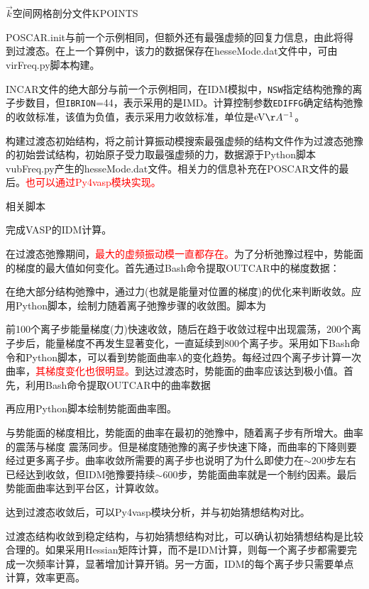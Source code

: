 $\vec k$空间网格剖分文件\textrm{KPOINTS}

\textrm{POSCAR.init}与前一个示例相同，但额外还有最强虚频的回复力信息，由此将得到过渡态。在上一个算例中，该力的数据保存在\textrm{hesseMode.dat}文件中，可由\textrm{virFreq.py}脚本构建。

\textrm{INCAR}文件的绝大部分与前一个示例相同，在\textrm{IDM}模拟中，\texttt{NSW}指定结构弛豫的离子步数目，但\texttt{IBRION}=44，表示采用的是\textrm{IMD}。计算控制参数\texttt{EDIFFG}确定结构弛豫的收敛标准，该值为负值，表示采用力收敛标准，单位是$\mathrm{eV}\AA^{-1}$。

构建过渡态初始结构，将之前计算振动模搜索最强虚频的结构文件作为过渡态弛豫的初始尝试结构，初始原子受力取最强虚频的力，数据源于\textrm{Python}脚本\textrm{vubFreq.py}产生的\textrm{hesseMode.dat}文件。相关力的信息补充在\textrm{POSCAR}文件的最后。\textcolor{red}{也可以通过\textrm{Py4vasp}模块实现。}

相关脚本

完成\textrm{VASP}的\textrm{IDM}计算。

在过渡态弛豫期间，\textcolor{red}{最大的虚频振动模一直都存在。}为了分析弛豫过程中，势能面的梯度的最大值如何变化。首先通过\textrm{Bash}命令提取\textrm{OUTCAR}中的梯度数据：

在绝大部分结构弛豫中，通过力(也就是能量对位置的梯度)的优化来判断收敛。应用\textrm{Python}脚本，绘制力随着离子弛豫步骤的收敛图。脚本为

前100个离子步能量梯度(力)快速收敛，随后在趋于收敛过程中出现震荡，200个离子步后，能量梯度不再发生显著变化，一直延续到800个离子步。采用如下\textrm{Bash}命令和\textrm{Python}脚本，可以看到势能面曲率$\lambda$的变化趋势。每经过四个离子步计算一次曲率，\textcolor{red}{其梯度变化也很明显。}到达过渡态时，势能面的曲率应该达到极小值。首先，利用\textrm{Bash}命令提取\textrm{OUTCAR}中的曲率数据

再应用\textrm{Python}脚本绘制势能面曲率图。

与势能面的梯度相比，势能面的曲率在最初的弛豫中，随着离子步有所增大。曲率的震荡与梯度 震荡同步。但是梯度随弛豫的离子步快速下降，而曲率的下降则要经过更多离子步。曲率收敛所需要的离子步也说明了为什么即使力在$\sim200$步左右已经达到收敛，但\textrm{IDM}弛豫要持续$\sim600$步，势能面曲率就是一个制约因素。最后势能面曲率达到平台区，计算收敛。

达到过渡态收敛后，可以\textrm{Py4vasp}模块分析，并与初始猜想结构对比。

过渡态结构收敛到稳定结构，与初始猜想结构对比，可以确认初始猜想结构是比较合理的。如果采用\textrm{Hessian}矩阵计算，而不是\textrm{IDM}计算，则每一个离子步都需要完成一次频率计算，显著增加计算开销。另一方面，\textrm{IDM}的每个离子步只需要单点计算，效率更高。

